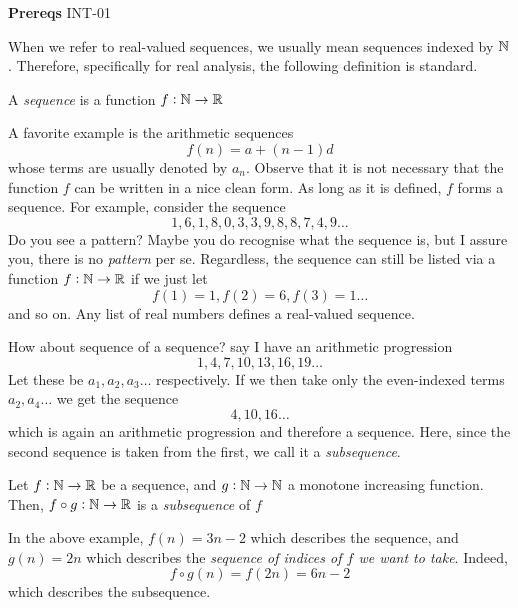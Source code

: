 

\textbf{Prereqs} INT-01 

When we refer to real-valued sequences, we usually mean sequences indexed by $\mathbb{N}$. Therefore, specifically for real analysis, the following definition is standard.
\begin{SNP}{\dfn}{A \emph{sequence} is a function $f : \mathbb{N} \rightarrow \mathbb{R}$}
\end{SNP}

A favorite example is the arithmetic sequences $$f(n) = a + (n - 1)d$$ whose terms are usually denoted by $a_n$. Observe that it is not necessary that the function $f$ can be written in a nice clean form. As long as it is defined, $f$ forms a sequence. For example, consider the sequence
$$
1, 6, 1, 8, 0, 3, 3, 9, 8, 8, 7, 4, 9 \dots
$$
Do you see a pattern? Maybe you do recognise what the sequence is, but I assure you, there is no \emph{pattern} per se. Regardless, the sequence can still be listed via a function $f: \mathbb{N} \rightarrow \mathbb{R}$ if we just let
$$
f(1) = 1, f(2) = 6, f(3) = 1 \dots
$$
and so on. Any list of real numbers defines a real-valued sequence.

How about sequence of a sequence? say I have an arithmetic progression
$$
1, 4, 7, 10, 13, 16, 19 \dots
$$
Let these be $a_1, a_2, a_3 \dots$ respectively. If we then take only the even-indexed terms $a_2, a_4 \dots$ we get the sequence
$$
4, 10, 16 \dots
$$
which is again an arithmetic progression and therefore a sequence. Here, since the second sequence is taken from the first, we call it a \emph{subsequence}.

\begin{SNP}{\dfn}
{
	Let $f: \mathbb{N} \rightarrow \mathbb{R}$ be a sequence, and $g: \mathbb{N} \rightarrow \mathbb{N}$ a monotone increasing function. Then, $f \circ g : \mathbb{N} \rightarrow \mathbb{R}$ is a \emph{subsequence} of $f$
}
\end{SNP}
In the above example, $f(n) = 3n -2$ which describes the sequence, and $g(n) = 2n$ which describes the \emph{sequence of indices of $f$ we want to take}. Indeed, $$f \circ g(n) = f(2n) = 6n - 2$$ which describes the subsequence.

